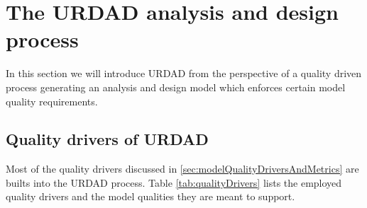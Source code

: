 \section{The URDAD analysis and design process}

In this section we will introduce URDAD from the perspective of a quality driven process generating an analysis and design model which enforces certain model quality requirements. 



\subsection{Quality drivers of URDAD}

Most of the quality drivers discussed in \ref{sec:modelQualityDriversAndMetrics} are builts into the URDAD process. Table \ref{tab:qualityDrivers} lists the employed quality drivers and the model qualities they are meant to support.

